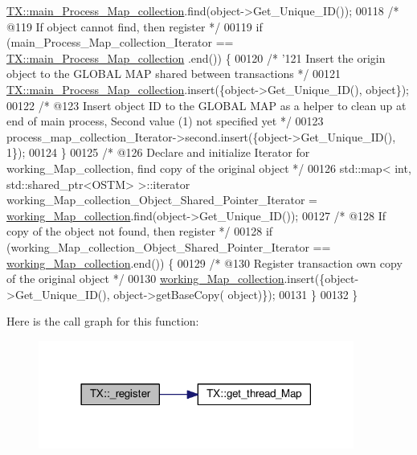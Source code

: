 \begin{DoxyCode}
      \hyperlink{class_t_x_a1a45d726894190695314464d7cd97c29_a1a45d726894190695314464d7cd97c29}{TX::main\_Process\_Map\_collection}.find(object->Get\_Unique\_ID());
00118     \textcolor{comment}{/* @119 If object cannot find, then register */}
00119     \textcolor{keywordflow}{if} (main\_Process\_Map\_collection\_Iterator == \hyperlink{class_t_x_a1a45d726894190695314464d7cd97c29_a1a45d726894190695314464d7cd97c29}{TX::main\_Process\_Map\_collection}
      .end()) \{
00120         \textcolor{comment}{/* '121 Insert the origin object to the GLOBAL MAP shared between transactions */}
00121         \hyperlink{class_t_x_a1a45d726894190695314464d7cd97c29_a1a45d726894190695314464d7cd97c29}{TX::main\_Process\_Map\_collection}.insert(\{\textcolor{keywordtype}{object}->Get\_Unique\_ID(), \textcolor{keywordtype}{
      object}\});
00122         \textcolor{comment}{/* @123 Insert object ID to the GLOBAL MAP as a helper to clean up at end of main process, Second
       value (1) not specified yet */}
00123         process\_map\_collection\_Iterator->second.insert(\{\textcolor{keywordtype}{object}->Get\_Unique\_ID(), 1\});
00124     \} 
00125     \textcolor{comment}{/* @126 Declare and initialize Iterator for working\_Map\_collection, find copy of the original object */}
00126     std::map< int, std::shared\_ptr<OSTM> >::iterator working\_Map\_collection\_Object\_Shared\_Pointer\_Iterator 
      = \hyperlink{class_t_x_a81aafda16e2f20e36ec6c68e584668ff_a81aafda16e2f20e36ec6c68e584668ff}{working\_Map\_collection}.find(object->Get\_Unique\_ID());
00127     \textcolor{comment}{/* @128 If copy of the object not found, then register */}
00128     \textcolor{keywordflow}{if} (working\_Map\_collection\_Object\_Shared\_Pointer\_Iterator == 
      \hyperlink{class_t_x_a81aafda16e2f20e36ec6c68e584668ff_a81aafda16e2f20e36ec6c68e584668ff}{working\_Map\_collection}.end()) \{
00129         \textcolor{comment}{/* @130 Register transaction own copy of the original object */}
00130         \hyperlink{class_t_x_a81aafda16e2f20e36ec6c68e584668ff_a81aafda16e2f20e36ec6c68e584668ff}{working\_Map\_collection}.insert(\{\textcolor{keywordtype}{object}->Get\_Unique\_ID(), \textcolor{keywordtype}{object}->getBaseCopy(\textcolor{keywordtype}{
      object})\});
00131     \}
00132 \}
\end{DoxyCode}


Here is the call graph for this function\+:\nopagebreak
\begin{figure}[H]
\begin{center}
\leavevmode
\includegraphics[width=294pt]{class_t_x_abc32af2f51df97ac483e5bfe7db6ca6e_abc32af2f51df97ac483e5bfe7db6ca6e_cgraph}
\end{center}
\end{figure}


